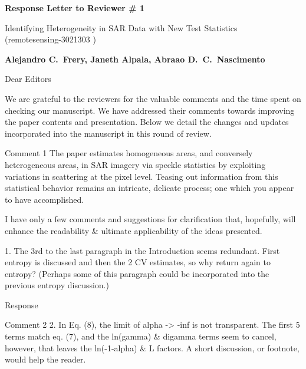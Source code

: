 \documentclass[11pt]{report}
\begin{document}
\begin{center}
\large{\textbf{Response Letter to Reviewer \# 1}}

\vglue 0.3cm

\huge{ Identifying Heterogeneity in SAR Data with New Test Statistics\\ (remotesensing-3021303 )}
\end{center}

\begin{center}
\textbf{Alejandro C.\ Frery, Janeth Alpala, Abraao D.\ C.\ Nascimento }
\end{center}

\date{\today}



\vspace{2cm}
\noindent Dear Editors
\bigskip

\noindent We are grateful to the reviewers for the valuable comments and the time spent on checking our manuscript. 
We have addressed their comments towards improving the paper contents and presentation. 
Below we detail the changes and updates incorporated into the manuscript in this round of review.

\medskip


\begin{reviewbox}{Comment 1}
The paper estimates homogeneous areas, and conversely heterogeneous areas, in SAR imagery via speckle statistics by exploiting variations in scattering at the pixel level. Teasing out information from this statistical behavior remains an intricate, delicate process; one which you appear to have accomplished. 

I have only a few comments and suggestions for clarification that, hopefully, will enhance the readability \& ultimate applicability of the ideas presented.

1. The 3rd to the last paragraph in the Introduction seems redundant. First entropy is discussed and then the 2 CV estimates, so why return again to entropy? (Perhaps some of this paragraph could be incorporated into the previous entropy discussion.)
\end{reviewbox}

\begin{responsebox}{Response}

\end{responsebox}

\begin{reviewbox}{Comment 2}
2. In Eq. (8), the limit of alpha -> -inf is not transparent. The first 5 terms match eq. (7), and the ln(gamma) \& digamma terms seem to cancel, however, that leaves the ln(-1-alpha) \& L factors. A short discussion, or footnote, would help the reader. 
\end{reviewbox}
\end{document}
